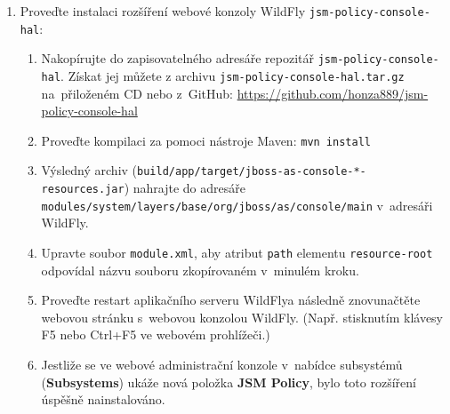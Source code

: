 \begin{enumerate}
  \item Proveďte instalaci rozšíření webové konzoly WildFly {\tt jsm-policy-console-hal}:
  \begin{enumerate}
    \item Nakopírujte do zapisovatelného adresáře repozitář {\tt jsm-policy-console-hal}. Získat jej můžete z archivu {\tt jsm-policy-console-hal.tar.gz} na~přiloženém CD nebo z~GitHub:
      \newline\url{https://github.com/honza889/jsm-policy-console-hal}
    \item Proveďte kompilaci za pomoci nástroje Maven: {\tt mvn install}
    \item Výsledný archiv ({\tt build/app/target/jboss-as-console-*-resources.jar}) nahrajte do adresáře {\tt modules/system/layers/base/org/jboss/as/console/main} v~adresáři WildFly.\footnotemark[1]
    \item Upravte soubor {\tt module.xml}, aby atribut {\tt path} elementu {\tt resource-root} odpovídal názvu souboru zkopírovaném v~minulém kroku.\footnotemark[1]
    \item Proveďte restart aplikačního serveru WildFly\footnotemark[1] a následně znovunačtěte webovou stránku s~webovou konzolou WildFly. (Např. stisknutím klávesy F5 nebo Ctrl+F5 ve webovém prohlížeči.)
    \item Jestliže se ve webové administrační konzole v~nabídce subsystémů ({\bf Subsystems}) ukáže nová položka {\bf JSM Policy}, bylo toto rozšíření úspěšně nainstalováno.
  \end{enumerate}
  
\end{enumerate}


